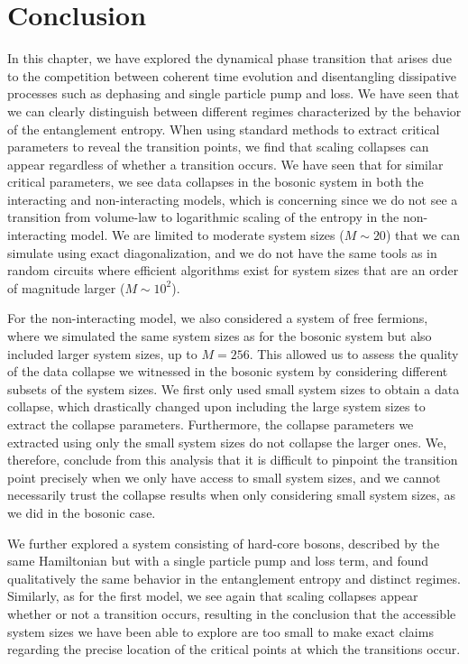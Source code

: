 \section{Conclusion}

In this chapter, we have explored the dynamical phase transition that arises due to the competition between coherent time evolution and disentangling dissipative processes such as dephasing and single particle pump and loss. We have seen that we can clearly distinguish between different regimes characterized by the behavior of the entanglement entropy. When using standard methods to extract critical parameters to reveal the transition points, we find that scaling collapses can appear regardless of whether a transition occurs. We have seen that for similar critical parameters, we see data collapses in the bosonic system in both the interacting and non-interacting models, which is concerning since we do not see a transition from volume-law to logarithmic scaling of the entropy in the non-interacting model. We are limited to moderate system sizes ($M \sim 20$) that we can simulate using exact diagonalization, and we do not have the same tools as in random circuits where efficient algorithms exist for system sizes that are an order of magnitude larger ($M \sim 10^2$). 

For the non-interacting model, we also considered a system of free fermions, where we simulated the same system sizes as for the bosonic system but also included larger system sizes, up to $M = 256$. This allowed us to assess the quality of the data collapse we witnessed in the bosonic system by considering different subsets of the system sizes. We first only used small system sizes to obtain a data collapse, which drastically changed upon including the large system sizes to extract the collapse parameters. Furthermore, the collapse parameters we extracted using only the small system sizes do not collapse the larger ones. We, therefore, conclude from this analysis that it is difficult to pinpoint the transition point precisely when we only have access to small system sizes, and we cannot necessarily trust the collapse results when only considering small system sizes, as we did in the bosonic case.

We further explored a system consisting of hard-core bosons, described by the same Hamiltonian but with a single particle pump and loss term, and found qualitatively the same behavior in the entanglement entropy and distinct regimes. Similarly, as for the first model, we see again that scaling collapses appear whether or not a transition occurs, resulting in the conclusion that the accessible system sizes we have been able to explore are too small to make exact claims regarding the precise location of the critical points at which the transitions occur. 

